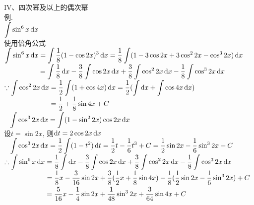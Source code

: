 IV、四次幂及以上的偶次幂\\
例.\\
\phantom{例}$\displaystyle\int\sin^6x\mathop{}\!\mathrm{d} x$\\
使用倍角公式\\
$\displaystyle\int\sin^6x\mathop{}\!\mathrm{d} x=\int\frac{1}{8}(1-\cos2x)^3\mathop{}\!\mathrm{d} x=\frac{1}{8}\int(1-3\cos2x+3\cos^22x-\cos^32x)\mathop{}\!\mathrm{d} x$\\
$\displaystyle\phantom{\int\sin^6x\dif x}=\int\frac{1}{8}\dif x-\frac{3}{8}\int\cos2x\dif x+\frac{3}{8}\int\cos^22x\dif x-\frac{1}{8}\int\cos^32x\dif x$\\
$\displaystyle\because\int\cos^22x\mathop{}\!\mathrm{d} x=\frac{1}{2}\int(1+\cos4x)\mathop{}\!\mathrm{d} x=\frac{1}{2}(\int\mathop{}\!\mathrm{d} x+\int\cos4x\mathop{}\!\mathrm{d} x)$\\
$\displaystyle\phantom{\because\int\cos^22x\dif x}=\frac{1}{2}+\frac{1}{8}\sin4x+C$\\
$\displaystyle\phantom{\because}\int\cos^32x\mathop{}\!\mathrm{d} x=\int(1-\sin^22x)\cos2x\mathop{}\!\mathrm{d} x$\\
\phantom{$\displaystyle\because$}设$t=\sin2x$, 则$\mathop{}\!\mathrm{d} t=2\cos2x\mathop{}\!\mathrm{d} x$\\
$\displaystyle\phantom{\because}\int\cos^32x\mathop{}\!\mathrm{d} x=\frac{1}{2}\int(1-t^2)\mathop{}\!\mathrm{d} t=\frac{1}{2}t-\frac{1}{6}t^3+C=\frac{1}{2}\sin2x-\frac{1}{6}\sin^32x+C$\\
$\displaystyle\therefore\int\sin^6x\mathop{}\!\mathrm{d} x=\frac{1}{8}\int\mathop{}\!\mathrm{d} x-\frac{3}{8}\int\cos2x\mathop{}\!\mathrm{d} x+\frac{3}{8}\int\cos^22x\mathop{}\!\mathrm{d} x-\frac{1}{8}\int\cos^32x\mathop{}\!\mathrm{d} x$\\
$\displaystyle\phantom{\therefore\int\sin^6x\dif x}=\frac{1}{8}x-\frac{3}{16}\sin2x+\frac{3}{8}(\frac{1}{2}x+\frac{1}{8}\sin4x)-\frac{1}{8}(\frac{1}{2}\sin2x-\frac{1}{6}\sin^32x)+C$\\
$\displaystyle\phantom{\therefore\int\sin^6x\dif x}=\frac{5}{16}x-\frac{1}{4}\sin2x+\frac{1}{48}\sin^32x+\frac{3}{64}\sin4x+C$\\

